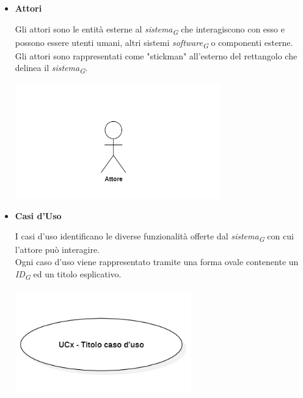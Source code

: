 \begin{itemize}
    \item \textbf{Attori} 
    
    Gli attori sono le entità esterne al \textit{sistema}\textsubscript{\textit{G}} che interagiscono con esso e possono essere utenti umani, altri sistemi \textit{software}\textsubscript{\textit{G}} o componenti esterne. \\
    Gli attori sono rappresentati come "stickman" all'esterno del rettangolo che delinea il \textit{sistema}\textsubscript{\textit{G}}.
    \begin{minipage}[H]{\linewidth}
        \centering
        \includegraphics[width=0.7\textwidth]{../Images/NormeDiProgetto/Attore.PNG}
    \end{minipage}

    \vspace{0.4cm}

    \item \textbf{Casi d'Uso} 
    
    I casi d'uso identificano le diverse funzionalità offerte dal \textit{sistema}\textsubscript{\textit{G}} con cui l'attore può interagire. \\
    Ogni caso d'uso viene rappresentato tramite una forma ovale contenente un \textit{ID}\textsubscript{\textit{G}} ed un titolo esplicativo.
    \begin{minipage}[H]{\linewidth}
        \centering
        \includegraphics[width=0.6\textwidth]{../Images/NormeDiProgetto/UC.PNG}
    \end{minipage}
    \pagebreak


\end{itemize}
